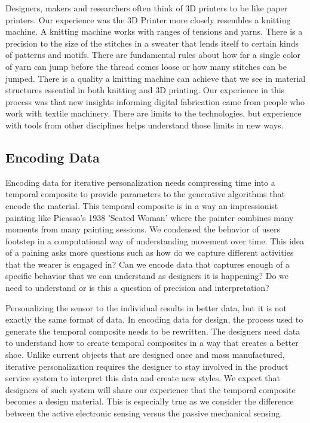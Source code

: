 Designers, makers and researchers often think of 3D printers to be like paper printers. Our experience was the 3D Printer more closely resembles a knitting machine. A knitting machine works with ranges of tensions and yarns. There is a precision to the size of the stitches in a sweater that lends itself to certain kinds of patterns and motifs. There are fundamental rules about how far a single color of yarn can jump before the thread comes loose or how many stitches can be jumped. There is a quality a knitting machine can achieve that we see in material structures essential in both knitting and 3D printing. Our experience in this process was that new insights informing digital fabrication came from people who work with textile machinery. There are limits to the technologies, but experience with tools from other disciplines helps understand those limits in new ways.

\subsection{Encoding Data}

Encoding data for iterative personalization needs compressing time into a temporal composite to provide parameters to the  generative algorithms that encode the material. This temporal composite is in a way an impressionist painting like Picasso's 1938 'Seated Woman' where the painter combines many moments from many painting sessions. We condensed the behavior of users footstep in a computational way of understanding movement over time. This idea of a paining asks more questions such as how do we capture different activities that the wearer is engaged in? Can we encode data that captures enough of a specific behavior that we can understand as designers it is happening?  Do we need to understand or is this a question of precision and interpretation?

Personalizing the sensor to the individual results in better data, but it is not exactly the same format of data. In  encoding data for design, the process used to generate the temporal composite needs to be rewritten. The designers need data to understand how to create temporal composites in a way that creates a better shoe. Unlike current objects that are designed once and mass manufactured, iterative personalization requires the designer to stay involved in the product service system to interpret this data and create new styles. We expect that designers of such system will share our experience that the temporal composite becomes a design material. This is especially true as we consider the difference between the active electronic sensing versus the passive mechanical sensing. 

